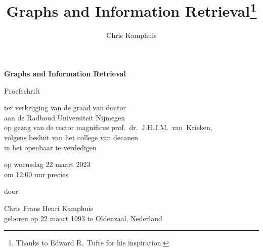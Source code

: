 \documentclass{tufte-book} %
\title{Graphs and Information Retrieval\thanks{Thanks to Edward R.~Tufte for his inspiration.}} %
\author[Chris Kamphuis]{Chris Kamphuis} %
\def\mytitle{Graphs and Information Retrieval}
\def\myauthor{Chris Frans Henri Kamphuis}
\begin{document}
\begin{titlepage}
	\begin{fullwidth}
	\begin{center}
		\vspace*{3.5cm}
		
		\huge{\bfseries\mytitle}
		
		\vspace*{15pt}
		
		
		\vspace*{5pt}
		
		\normalsize
		
		\vspace{2.0cm}
		
		Proefschrift
		
		\vspace{0.5cm}
		
		ter verkrijging van de graad van doctor\\
		aan de Radboud Universiteit Nijmegen\\
		op gezag van de rector magnificus prof.~dr.~J.H.J.M.\ van\ Krieken,\\
		volgens besluit van het college van decanen\\
		in het openbaar te verdedigen
		
		\vspace{0.5cm}
		
		op woensdag 22 maart 2023 \\
		om 12:00 uur precies
		
		\vspace{0.5cm}
		
		door
		
		\vspace{0.5cm}
		
		\myauthor\\
		
		geboren op 22 maart 1993 te Oldenzaal, Nederland
	\end{center}
	\end{fullwidth}
\end{titlepage}

\newpage%

\end{document}
